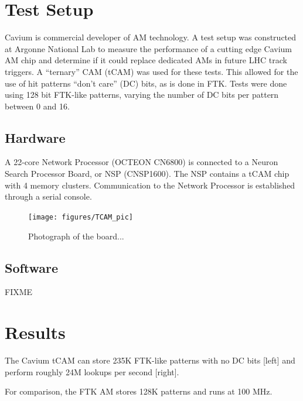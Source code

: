\documentclass[preprint,prd,showpacs]{revtex4-1}
\begin{document}
\section{Test Setup}\label{sec:TestSetup}

Cavium is commercial developer of AM technology. A test setup was constructed at Argonne National Lab to measure the performance of a cutting edge Cavium AM chip and determine if it could replace dedicated AMs in future LHC track triggers.
A “ternary” CAM (tCAM) was used for these tests. This allowed for the use of hit patterns “don’t care” (DC) bits, as is done in FTK. Tests were done using 128 bit FTK-like patterns, varying the number of DC bits per pattern between 0 and 16.

\subsection{Hardware}

A 22-core Network Processor (OCTEON CN6800) is connected to a Neuron Search Processor Board, or NSP (CNSP1600).
The NSP contains a tCAM chip with 4 memory clusters. 
Communication to the Network Processor is established through a serial console.

\begin{figure}[!htb]
\begin{center}
\texttt{[image: figures/TCAM\_pic]}
\caption{Photograph of the board...}
\label{fig:board_pic}
\end{center}
\end{figure}

\subsection{Software}

FIXME



\section{Results}\label{sec:Results}

The Cavium tCAM can store 235K FTK-like patterns with no DC bits [left] and perform roughly 24M lookups per second [right].

For comparison, the FTK AM stores 128K patterns and runs at 100 MHz.
\end{document}
